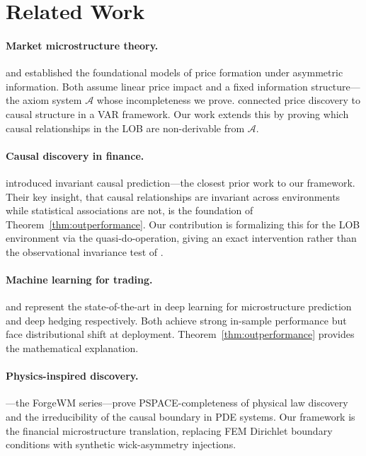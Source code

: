 \documentclass[12pt]{article}
\begin{document}
\section{Related Work}
\label{sec:related}

\paragraph{Market microstructure theory.}
\citet{kyle1985} and \citet{glostenmilgrom1985} established the
foundational models of price formation under asymmetric information.
Both assume linear price impact and a fixed information structure---the
axiom system $\mathcal{A}$ whose incompleteness we prove.
\citet{hasbrouck1991} connected price discovery to causal structure
in a VAR framework.
Our work extends this by proving which causal relationships in the LOB
are non-derivable from $\mathcal{A}$.

\paragraph{Causal discovery in finance.}
\citet{peters2016} introduced invariant causal prediction---the closest
prior work to our framework.
Their key insight, that causal relationships are invariant across
environments while statistical associations are not, is the
foundation of Theorem~\ref{thm:outperformance}.
Our contribution is formalizing this for the LOB environment via the
quasi-do-operation, giving an exact intervention rather than the
observational invariance test of \citet{peters2016}.

\paragraph{Machine learning for trading.}
\citet{limzohren2021} and \citet{buehler2019} represent the
state-of-the-art in deep learning for microstructure prediction
and deep hedging respectively.
Both achieve strong in-sample performance but face distributional
shift at deployment.
Theorem~\ref{thm:outperformance} provides the mathematical explanation.

\paragraph{Physics-inspired discovery.}
\citet{maes2026a, maes2026b, maes2026c}---the ForgeWM series---prove
PSPACE-completeness of physical law discovery and the irreducibility
of the causal boundary in PDE systems.
Our framework is the financial microstructure translation,
replacing FEM Dirichlet boundary conditions with synthetic
wick-asymmetry injections.
\end{document}
